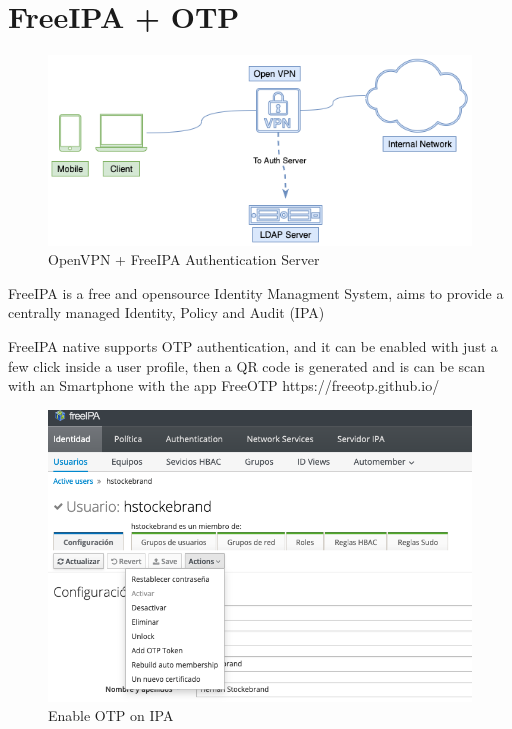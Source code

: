 \newpage

\section{FreeIPA + OTP}

\begin{figure}[!h]
  \centering
  \includegraphics[width=160mm]{images/Pfsense - FreeIPA.drawio.png}
  \caption{OpenVPN + FreeIPA Authentication Server}
  \label{fig:label}
\end{figure}


FreeIPA is a free and opensource Identity Managment System, aims to provide a centrally managed Identity, Policy and Audit (IPA)

FreeIPA native supports OTP authentication, and it can be enabled with just a few click inside a user profile, then a QR code is generated and is can be scan with an Smartphone with the app FreeOTP
https://freeotp.github.io/

\begin{figure}[!h]
    \centering
    \includegraphics[width=140mm]{images/enable_OTP_IPA.png}
    \caption{Enable OTP on IPA}
    \label{fig:label}
\end{figure}

